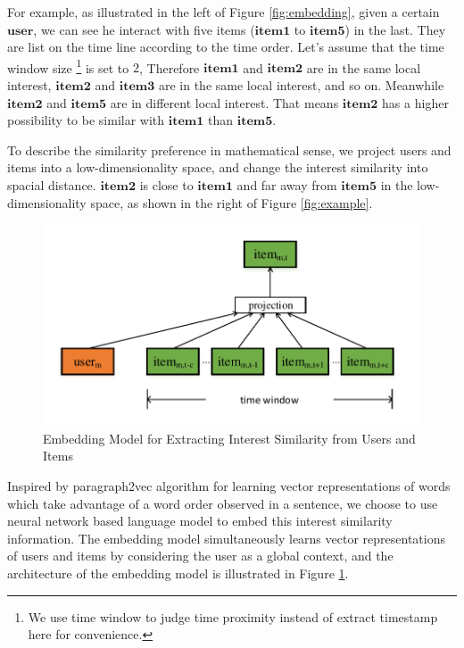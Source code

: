 \documentclass{sig-alternate-05-2015}
\begin{document}
For example, as illustrated in the left of Figure \ref{fig:embedding},
given a certain $\mathbf{user}$, we can see he interact with five items
($\mathbf{item1}$ to $\mathbf{item5}$) in the last.
They are list on the time line according to the time order.
Let's assume that the time window size \footnote{We use time window to judge time proximity
instead of extract timestamp here for convenience.} is set to $2$,
Therefore $\mathbf{item1}$ and $\mathbf{item2}$ are in the same local interest,
$\mathbf{item2}$ and $\mathbf{item3}$ are in the same local interest, and so on.
Meanwhile $\mathbf{item2}$ and $\mathbf{item5}$ are in different local interest.
That means $\mathbf{item2}$ has a higher possibility to be similar with $\mathbf{item1}$
than $\mathbf{item5}$.

To describe the similarity preference in mathematical sense,
we project users and items into a low-dimensionality space,
and change the interest similarity into spacial distance.
$\mathbf{item2}$ is close to $\mathbf{item1}$ and far away from $\mathbf{item5}$
in the low-dimensionality space, as shown in the right of Figure \ref{fig:example}.

\begin{figure}[htbp]
	\centering
	\includegraphics[scale=0.55]{images/doc2vec.pdf}
	\caption{Embedding Model for Extracting Interest Similarity from Users and Items}
	\label{fig:doc2vec}
\end{figure}

Inspired by paragraph2vec algorithm \cite{le2014distributed} for learning
vector representations of words which take advantage of
a word order observed in a sentence,
we choose to use neural network based language model
to embed this interest similarity information.
The embedding model simultaneously learns vector representations of users and items
by considering the user as a global context,
and the architecture of the embedding model is illustrated in Figure \ref{fig:doc2vec}.
\end{document}
